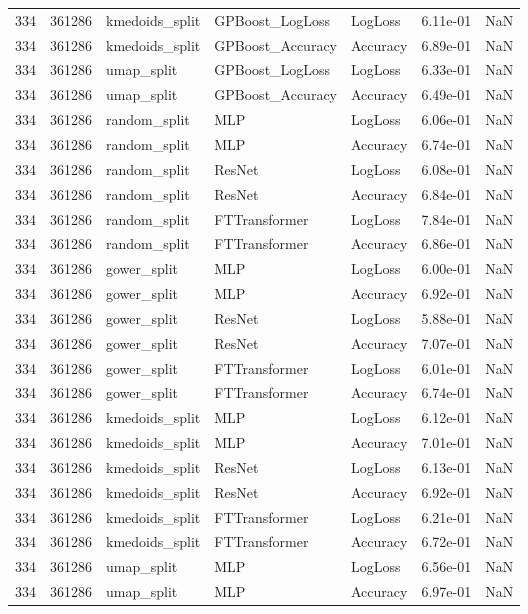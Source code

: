 \begin{tabular}{rrlllrr}
334 & 361286 & kmedoids\_split & GPBoost\_LogLoss & LogLoss & 6.11e-01 & NaN \\
334 & 361286 & kmedoids\_split & GPBoost\_Accuracy & Accuracy & 6.89e-01 & NaN \\
334 & 361286 & umap\_split & GPBoost\_LogLoss & LogLoss & 6.33e-01 & NaN \\
334 & 361286 & umap\_split & GPBoost\_Accuracy & Accuracy & 6.49e-01 & NaN \\
334 & 361286 & random\_split & MLP & LogLoss & 6.06e-01 & NaN \\
334 & 361286 & random\_split & MLP & Accuracy & 6.74e-01 & NaN \\
334 & 361286 & random\_split & ResNet & LogLoss & 6.08e-01 & NaN \\
334 & 361286 & random\_split & ResNet & Accuracy & 6.84e-01 & NaN \\
334 & 361286 & random\_split & FTTransformer & LogLoss & 7.84e-01 & NaN \\
334 & 361286 & random\_split & FTTransformer & Accuracy & 6.86e-01 & NaN \\
334 & 361286 & gower\_split & MLP & LogLoss & 6.00e-01 & NaN \\
334 & 361286 & gower\_split & MLP & Accuracy & 6.92e-01 & NaN \\
334 & 361286 & gower\_split & ResNet & LogLoss & 5.88e-01 & NaN \\
334 & 361286 & gower\_split & ResNet & Accuracy & 7.07e-01 & NaN \\
334 & 361286 & gower\_split & FTTransformer & LogLoss & 6.01e-01 & NaN \\
334 & 361286 & gower\_split & FTTransformer & Accuracy & 6.74e-01 & NaN \\
334 & 361286 & kmedoids\_split & MLP & LogLoss & 6.12e-01 & NaN \\
334 & 361286 & kmedoids\_split & MLP & Accuracy & 7.01e-01 & NaN \\
334 & 361286 & kmedoids\_split & ResNet & LogLoss & 6.13e-01 & NaN \\
334 & 361286 & kmedoids\_split & ResNet & Accuracy & 6.92e-01 & NaN \\
334 & 361286 & kmedoids\_split & FTTransformer & LogLoss & 6.21e-01 & NaN \\
334 & 361286 & kmedoids\_split & FTTransformer & Accuracy & 6.72e-01 & NaN \\
334 & 361286 & umap\_split & MLP & LogLoss & 6.56e-01 & NaN \\
334 & 361286 & umap\_split & MLP & Accuracy & 6.97e-01 & NaN \\

\end{tabular}
